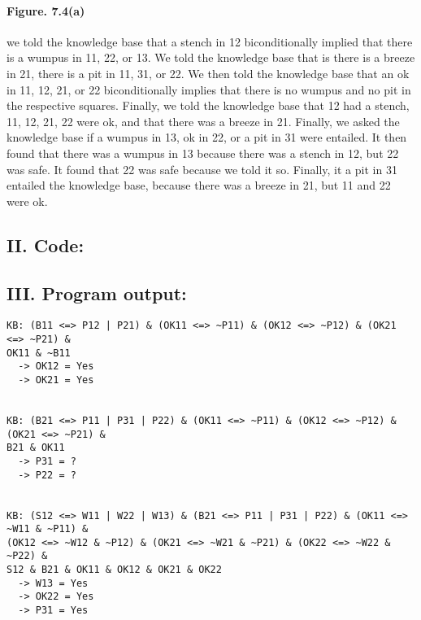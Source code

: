 \documentclass[a4paper]{report}
\begin{document}
\paragraph{Figure. 7.4(a) } we told the knowledge base that a stench in 12 biconditionally implied that there is a wumpus in 11, 22, or 13. We told the knowledge base that is there is a breeze in 21, there is a pit in 11, 31, or 22. We then told the knowledge base that an ok in 11, 12, 21, or 22 biconditionally implies that there is no wumpus and no pit in the respective squares. Finally, we told the knowledge base that 12 had a stench, 11, 12, 21, 22 were ok, and that there was a breeze in 21. Finally, we asked the knowledge base if a wumpus in 13, ok in 22, or a pit in 31 were entailed. It then found that there was a wumpus in 13 because there was a stench in 12, but 22 was safe. It found that 22 was safe because we told it so. Finally, it a pit in 31 entailed the knowledge base, because there was a breeze in 21, but 11 and 22 were ok. \\

\subsection*{II. Code:}


\subsection*{III. Program output:}

\begin{verbatim}
KB: (B11 <=> P12 | P21) & (OK11 <=> ~P11) & (OK12 <=> ~P12) & (OK21 <=> ~P21) & 
OK11 & ~B11
  -> OK12 = Yes
  -> OK21 = Yes


KB: (B21 <=> P11 | P31 | P22) & (OK11 <=> ~P11) & (OK12 <=> ~P12) & (OK21 <=> ~P21) & 
B21 & OK11
  -> P31 = ?
  -> P22 = ?


KB: (S12 <=> W11 | W22 | W13) & (B21 <=> P11 | P31 | P22) & (OK11 <=> ~W11 & ~P11) & 
(OK12 <=> ~W12 & ~P12) & (OK21 <=> ~W21 & ~P21) & (OK22 <=> ~W22 & ~P22) & 
S12 & B21 & OK11 & OK12 & OK21 & OK22
  -> W13 = Yes
  -> OK22 = Yes
  -> P31 = Yes
\end{verbatim}
\end{document}
